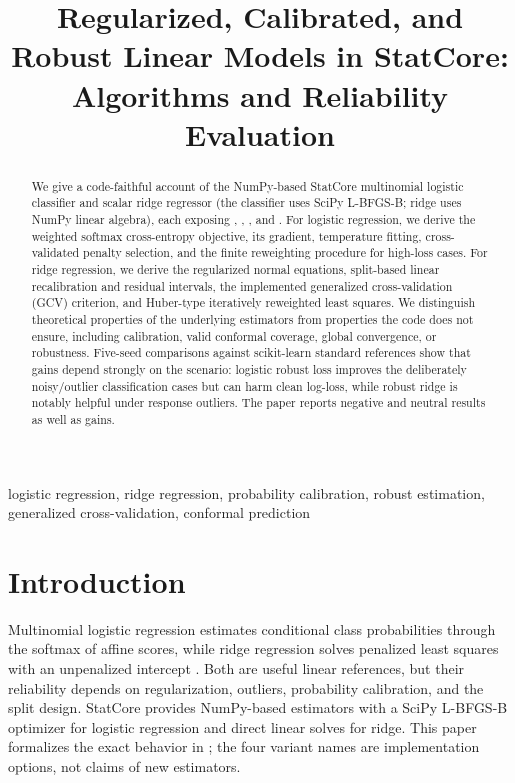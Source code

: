 \documentclass[conference]{IEEEtran}
\title{Regularized, Calibrated, and Robust Linear Models in StatCore: Algorithms and Reliability Evaluation}
\author{\jabulaniauthor\and\martinchanzauthor\and\oloratoauthor\and\mfundoauthor}
\begin{document}
\maketitle
\begin{abstract}
We give a code-faithful account of the NumPy-based StatCore multinomial logistic classifier and scalar ridge regressor (the classifier uses SciPy L-BFGS-B; ridge uses NumPy linear algebra), each exposing , , , and . For logistic regression, we derive the weighted softmax cross-entropy objective, its gradient, temperature fitting, cross-validated penalty selection, and the finite reweighting procedure for high-loss cases. For ridge regression, we derive the regularized normal equations, split-based linear recalibration and residual intervals, the implemented generalized cross-validation (GCV) criterion, and Huber-type iteratively reweighted least squares. We distinguish theoretical properties of the underlying estimators from properties the code does not ensure, including calibration, valid conformal coverage, global convergence, or robustness. Five-seed comparisons against scikit-learn standard references show that gains depend strongly on the scenario: logistic robust loss improves the deliberately noisy/outlier classification cases but can harm clean log-loss, while robust ridge is notably helpful under response outliers. The paper reports negative and neutral results as well as gains.
\end{abstract}
\begin{IEEEkeywords}
logistic regression, ridge regression, probability calibration, robust estimation, generalized cross-validation, conformal prediction
\end{IEEEkeywords}

\section{Introduction}
Multinomial logistic regression estimates conditional class probabilities through the softmax of affine scores, while ridge regression solves penalized least squares with an unpenalized intercept \cite{mccullagh1989,hoerl1970}. Both are useful linear references, but their reliability depends on regularization, outliers, probability calibration, and the split design. StatCore provides NumPy-based estimators with a SciPy L-BFGS-B optimizer for logistic regression and direct linear solves for ridge. This paper formalizes the exact behavior in ; the four variant names are implementation options, not claims of new estimators.
\end{document}
